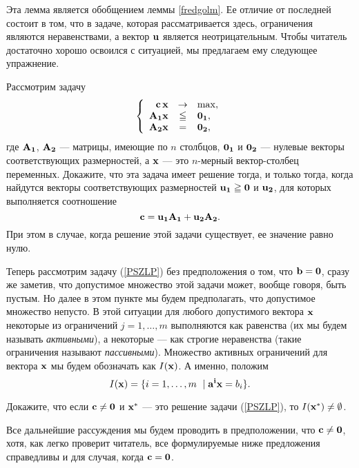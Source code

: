     Эта лемма  является обобщением леммы \ref{fredgolm}.
    Ее отличие от последней состоит в том, что в задаче, которая
    рассматривается здесь, ограничения
    являются неравенствами, а вектор $\mathbf{u}$ является
    неотрицательным. Чтобы читатель достаточно хорошо освоился с
    ситуацией, мы предлагаем ему следующее упражнение.
\begin{exer}
    Рассмотрим задачу
\begin{equation}
\left\{\begin{array}{rcl}
          \mathbf{c} \, \mathbf{x} & \to & \max, \\
         \mathbf{A_{1}}\mathbf{x} & \leqq &\mathbf{0_{1}},\\
         \mathbf{A_{2}}\mathbf{x} & = &\mathbf{0_{2}},
       \end{array}
\right.
\end{equation}
где $\mathbf{A_{1}}$, $\mathbf{A_{2}}$ --- матрицы, имеющие по $n$ столбцов,
$\mathbf{0_{1}}$ и $\mathbf{0_{2}}$ --- нулевые векторы соответствующих
размерностей, а $\mathbf{x}$
--- это $n$-мерный вектор-столбец переменных. Докажите, что эта
задача имеет решение тогда, и только тогда, когда найдутся векторы
соответствующих размерностей
    $\mathbf{u_{1}}\geqq\mathbf{0}$ и $\mathbf{u_{2}}$, для которых выполняется
    соотношение
    \[\mathbf{c}=\mathbf{u_{1}}\mathbf{A_{1}}+\mathbf{u_{2}}\mathbf{A_{2}}.\]
    При этом в случае, когда решение этой задачи
    существует, ее значение равно нулю.
\end{exer}

    Теперь рассмотрим задачу (\ref{PSZLP}) без
    предположения о том, что $\mathbf{b}=\mathbf{0}$, сразу же заметив, что
    допустимое множество этой задачи может, вообще говоря, быть
    пустым. Но далее в этом пункте мы будем предполагать,
    что допустимое множество непусто.
    В этой ситуации для любого допустимого вектора $\mathbf{x}$
    некоторые из ограничений $j=1,\ldots,m$ выполняются как
    равенства (их мы будем называть \emph{активными}), а
    некоторые --- как строгие неравенства (такие ограничения называют
    \emph{пассивными}). Множество активных
    ограничений для вектора $\mathbf{x}$ мы будем обозначать как
    $I(\mathbf{x})$. А именно, положим
    \[I(\mathbf{x})=\{i=1,\ldots,m\ \mid \mathbf{a^{i}}\mathbf{x}=b_{i}\}.\]


\begin{exer}
    Докажите, что если
    $\mathbf{c}\neq\mathbf{0}$ и $\mathbf{x^{*}}$ --- это решение задачи (\ref{PSZLP}),
    то $I(\mathbf{x^{*}})\neq\emptyset$.
\end{exer}

     Все дальнейшие рассуждения мы будем проводить в предположении, что
    $\mathbf{c}\neq\mathbf{0}$, хотя, как легко проверит читатель, все формулируемые
    ниже предложения справедливы и для случая, когда
    $\mathbf{c}=\mathbf{0}$.

